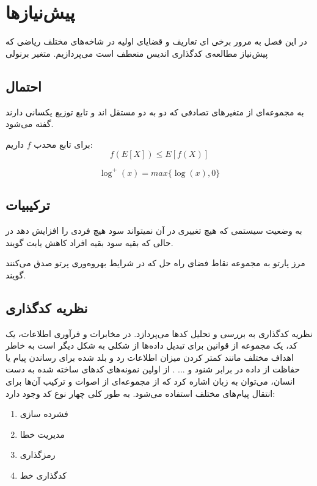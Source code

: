 \chapter{پیش‌نیازها}
\label{chapter:preliminaries}
در این فصل به مرور برخی ای تعاریف و قضایای اولیه در شاخه‌های مختلف ریاضی که پیش‌نیاز مطالعه‌ی کدگذاری اندیس منعطف است می‌پردازیم.
متغیر برنولی
\section{احتمال}
\begin{definition}
به مجموعه‌ای از متغیرهای تصادفی که دو به دو مستقل اند و تابع توزیع یکسانی دارند گفته می‌شود.
\end{definition}
\begin{theorem}
	\label{Jensen}
	برای تابع محدب
	$f$
	داریم:
	$$f(E[X]) \leq E[f(X)]$$
\end{theorem}

$$\log^{+}(x) = max\{\log(x), 0\}$$
\section{ترکیبیات}

\begin{definition}
	\label{def:Pareto}
	به وضعیت سیستمی که هیچ تغییری در آن نمیتواند سود هیچ فردی را افزایش دهد
	در حالی که بقیه سود بقیه افراد کاهش یابت گویند.
	\cite{wiki:pareto}
	
	مرز پارتو
	\label{def:Pareto-boundary}
	به مجموعه نقاط فضای راه حل که در شرایط بهروه‌وری پرتو صدق می‌کنند گویند.
\end{definition}

\section{نظریه کدگذاری}
نظریه کدگذاری به بررسی و تحلیل کد‌ها می‌پردازد. در مخابرات و فرآوری اطلاعات، یک کد، یک مجموعه‌ از قوانین برای تبدیل داده‌ها از شکلی به شکل دیگر است به خاطر اهداف مختلف مانند کمتر کردن میزان اطلاعات رد و بلد شده برای رساندن پیام یا حفاظت از داده در برابر شنود و ... . از اولین نمونه‌های کدهای ساخته شده به دست انسان، می‌توان به زبان اشاره کرد که از مجموعه‌ای از اصوات و ترکیب آن‌ها برای انتقال پیام‌های مختلف استفاده می‌شود. به طور کلی چهار نوع کد وجود دارد:
\begin{enumerate}
	\item
	فشرده سازی
	\item
	مدیریت خطا
	\item
	رمزگذاری
	\item
	کدگذاری خط
\end{enumerate}
\cite{wiki:coding1, wiki:coding2}

